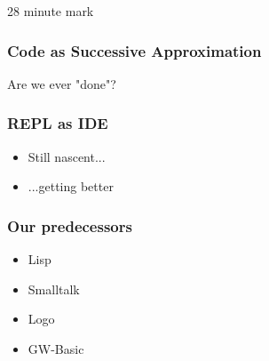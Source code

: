 28 minute mark

\begin{frame}
\frametitle{Code as Successive Approximation}

Are we ever "done"?

\end{frame}

\begin{frame}
\frametitle{REPL as IDE}

\begin{itemize}
\item Still nascent...
\item ...getting better
\end{itemize}

\end{frame}

\begin{frame}
\frametitle{Our predecessors}

\begin{itemize}
\item Lisp
\item Smalltalk
\item Logo
\item GW-Basic
\end{itemize}

\end{frame}


